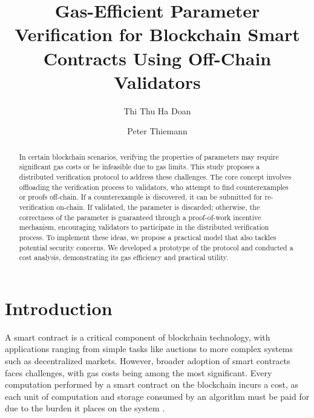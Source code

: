 \documentclass[runningheads]{llncs}
\begin{document}
%
\title{Gas-Efficient Parameter Verification for Blockchain Smart Contracts Using Off-Chain Validators}
%
%
\author{Thi Thu Ha Doan\and Peter Thiemann}
%
%
%
\maketitle              %
%
\begin{abstract}
In certain blockchain scenarios, verifying the properties of parameters may require significant gas costs or be infeasible due to gas limits. This study proposes a distributed verification protocol to address these challenges. The core concept involves offloading the verification process to validators, who attempt to find counterexamples or proofs off-chain. If a counterexample is discovered, it can be submitted for re-verification on-chain. If validated, the parameter is discarded; otherwise, the correctness of the parameter is guaranteed through a proof-of-work incentive mechanism, encouraging validators to participate in the distributed verification process. To implement these ideas, we propose a practical model that also tackles potential security concerns. We developed a prototype of the protocol and conducted a cost analysis, demonstrating its gas efficiency and practical utility.
\end{abstract}
%
%
%
\section{Introduction}
\label{sec:introduction}
\lstset{language=solidity}
A smart contract \cite{szabo1997smartcontracts,eth-whitepaper,tezos-whitepaper} is a critical component of blockchain technology, with applications ranging from simple tasks like auctions to more complex systems such as decentralized markets. However, broader adoption of smart contracts faces challenges, with gas costs being among the most significant. Every computation performed by a smart contract on the blockchain incurs a cost, as each unit of computation and storage consumed by an algorithm must be paid for due to the burden it places on the system \cite{eth-whitepaper,eth-yellowpaper,gas-cost}.
\end{document}
